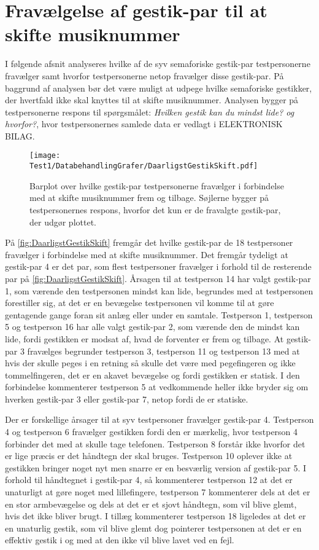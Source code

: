 \section{Fravælgelse af gestik-par til at skifte musiknummer}
\label{app:TestresultaterSkiftDaarlig}
%
I følgende afsnit analyseres hvilke af de syv semaforiske gestik-par testpersonerne fravælger samt hvorfor testpersonerne netop fravælger disse gestik-par. På baggrund af analysen bør det være muligt at udpege hvilke semaforiske gestikker, der hvertfald ikke skal knyttes til at skifte musiknummer. Analysen bygger på testpersonerne respons til spørgsmålet: \textit{Hvilken gestik kan du mindst lide? og hvorfor?}, hvor testpersonernes samlede data er vedlagt i ELEKTRONISK BILAG.
%
\begin{figure}[H]
	\centering
	\texttt{[image: Test1/DatabehandlingGrafer/DaarligstGestikSkift.pdf]}
	\caption{Barplot over hvilke gestik-par testpersonerne fravælger i forbindelse med at skifte musiknummer frem og tilbage. Søjlerne bygger på testpersonernes respons, hvorfor det kun er de fravalgte gestik-par, der udgør plottet.}
	\label{fig:DaarligstGestikSkift}
\end{figure}
\noindent
%
På \autoref{fig:DaarligstGestikSkift} fremgår det hvilke gestik-par de 18 testpersoner fravælger i forbindelse med at skifte musiknummer. Det fremgår tydeligt at gestik-par 4 er det par, som flest testpersoner fravælger i forhold til de resterende par på \autoref{fig:DaarligstGestikSkift}. Årsagen til at testperson 14 har valgt gestik-par 1, som værende den testpersonen mindst kan lide, begrundes med at testpersonen forestiller sig, at det er en bevægelse testpersonen vil komme til at gøre gentagende gange foran sit anlæg eller under en samtale. Testperson 1, testperson 5 og testperson 16 har alle valgt gestik-par 2, som værende den de mindst kan lide, fordi gestikken er modsat af, hvad de forventer er frem og tilbage. At gestik-par 3 fravælges begrunder testperson 3, testperson 11 og testperson 13 med at hvis der skulle peges i en retning så skulle det være med pegefingeren og ikke tommelfingeren, det er en akavet bevægelse og fordi gestikken er statisk. I den forbindelse kommenterer testperson 5 at vedkommende heller ikke bryder sig om hverken gestik-par 3 eller gestik-par 7, netop fordi de er statiske.

Der er forskellige årsager til at syv testpersoner fravælger gestik-par 4. Testperson 4 og testperson 6 fravælger gestikken fordi den er mærkelig, hvor testperson 4 forbinder det med at skulle tage telefonen. Testperson 8 forstår ikke hvorfor det er lige præcis er det håndtegn der skal bruges. Testperson 10 oplever ikke at gestikken bringer noget nyt men snarre er en besværlig version af gestik-par 5. I forhold til håndtegnet i gestik-par 4, så kommenterer testperson 12 at det er unaturligt at gøre noget med lillefingere, testperson 7 kommenterer dels at det er en stor armbevægelse og dels at det er et sjovt håndtegn, som vil blive glemt, hvis det ikke bliver brugt. I tillæg kommenterer testperson 18 ligeledes at det er en unaturlig gestik, som vil blive glemt dog pointerer testpersonen at det er en effektiv gestik i og med at den ikke vil blive lavet ved en fejl. 

